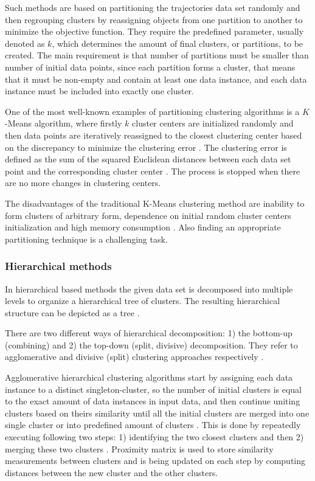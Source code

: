 Such methods are based on partitioning the trajectories data set randomly and then regrouping clusters by reassigning objects from one partition to another to minimize the objective function. They require the predefined parameter, usually denoted as $k$, which determines the amount of final clusters, or partitions, to be created. The main requirement is that number of partitions must be smaller than number of initial data points, since each partition forms a cluster, that means that it must be non-empty and contain at least one data instance, and each data instance must be included into exactly one cluster.

One of the most well-known examples of partitioning clustering algorithms is a $K$-Means algorithm, where firstly $k$ cluster centers are initialized randomly and then data points are iteratively reassigned to the closest clustering center based on the discrepancy to minimize the clustering error \cite{article:23_survey_ca}. The clustering error is defined as the sum of the squared Euclidean distances between each data set point and the corresponding cluster center \cite{article:24_glkkm_cl_fs}. The process is stopped when there are no more changes in clustering centers.

The disadvantages of the traditional K-Means clustering method are inability to form clusters of arbitrary form, dependence on initial random cluster centers initialization and high memory consumption \cite{article:8_review_mot_cl_alg}. Also finding an appropriate partitioning technique is a challenging task.

\subsubsection{Hierarchical methods}

In hierarchical based methods the given data set is decomposed into multiple levels to organize a hierarchical tree of clusters. The resulting hierarchical structure can be depicted as a tree \cite{article:23_survey_ca}.

There are two different ways of hierarchical decomposition: 1) the bottom-up (combining) and 2) the top-down (split, divisive) decomposition. They refer to agglomerative and divisive (split) clustering approaches respectively \cite{online:what_is_hier_clust}.

Agglomerative hierarchical clustering algorithms start by assigning each data instance to a distinct singleton-cluster, so the number of initial clusters is equal to the exact amount of data instances in input data, and then continue uniting clusters based on theirs similarity until all the initial clusters are merged into one single cluster or into predefined amount of clusters \cite{online:unders_hier_cl}. This is done by repeatedly executing following two steps: 1) identifying the two closest clusters and then 2) merging these two clusters \cite{online:what_is_hier_clust}. Proximity matrix is used to store similarity measurements between clusters and is being updated on each step by computing distances between the new cluster and the other clusters.

